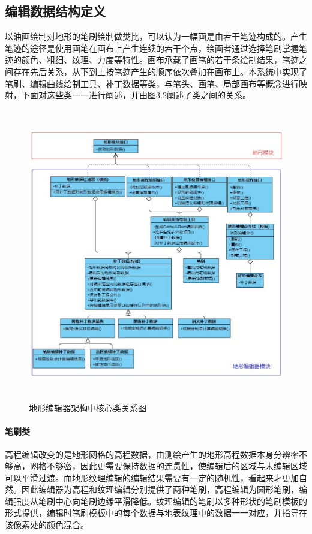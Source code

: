 \subsection{编辑数据结构定义}
以油画绘制对地形的笔刷绘制做类比，可以认为一幅画是由若干笔迹构成的。产生笔迹的途径是使用画笔在画布上产生连续的若干个点，绘画者通过选择笔刷掌握笔迹的颜色、粗细、纹理、力度等特性。画布承载了画笔的若干条绘制结果，笔迹之间存在先后关系，从下到上按笔迹产生的顺序依次叠加在画布上。本系统中实现了笔刷、编辑曲线绘制工具、补丁数据等类，与笔头、画笔、局部画布等概念进行映射，下面对这些类一一进行阐述，并由图3.2阐述了类之间的关系。\par
\begin{figure}[htb]
\centering
\includegraphics[height=12.8cm,width=12.5cm]{figures/structure2.JPG}
\caption{地形编辑器架构中核心类关系图}
\end{figure}
\paragraph{笔刷类}
高程编辑改变的是地形网格的高程数据，由测绘产生的地形高程数据本身分辨率不够高，网格不够密，因此更需要保持数据的连贯性，使编辑后的区域与未编辑区域可以平滑过渡。而地形纹理编辑的编辑结果需要有一定的随机性，看起来才更加自然。因此编辑器为高程和纹理编辑分别提供了两种笔刷，高程编辑为圆形笔刷，编辑强度从笔刷中心向笔刷边缘平滑降低。纹理编辑的笔刷以多种形状的笔刷模板的形式提供，编辑时笔刷模板中的每个数据与地表纹理中的数据一一对应，并指导在该像素处的颜色混合。
